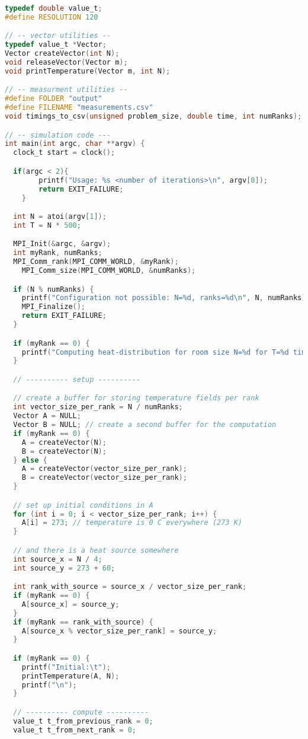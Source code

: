 \documentclass[UTF-8]{article}
\begin{document}
\begin{itemize}
\begin{enumerate}[label=\textbf{\arabic *)}]
\begin{lstlisting}[language=c]
typedef double value_t;
#define RESOLUTION 120

// -- vector utilities --
typedef value_t *Vector;
Vector createVector(int N);
void releaseVector(Vector m);
void printTemperature(Vector m, int N);

// -- measurment utilities --
#define FOLDER "output"
#define FILENAME "measurements.csv"
void timings_to_csv(unsigned problem_size, double time, int numRanks);

// -- simulation code ---
int main(int argc, char **argv) {
  clock_t start = clock();

  if(argc < 2){
		printf("Usage: %s <number of iterations>\n", argv[0]);
		return EXIT_FAILURE;
	}

  int N = atoi(argv[1]);
  int T = N * 500;

  MPI_Init(&argc, &argv);
  int myRank, numRanks;
  MPI_Comm_rank(MPI_COMM_WORLD, &myRank);
	MPI_Comm_size(MPI_COMM_WORLD, &numRanks);

  if (N % numRanks) {
    printf("Configuration not possible: N=%d, ranks=%d\n", N, numRanks);
    MPI_Finalize();
    return EXIT_FAILURE;
  }

  if (myRank == 0) {
    printf("Computing heat-distribution for room size N=%d for T=%d timesteps\n", N, T);
  }

  // ---------- setup ----------

  // create a buffer for storing temperature fields per rank
  int vector_size_per_rank = N / numRanks;
  Vector A = NULL;
  Vector B = NULL; // create a second buffer for the computation
  if (myRank == 0) {
    A = createVector(N);
    B = createVector(N);
  } else {
    A = createVector(vector_size_per_rank);
    B = createVector(vector_size_per_rank);
  }

  // set up initial conditions in A
  for (int i = 0; i < vector_size_per_rank; i++) {
    A[i] = 273; // temperature is 0 C everywhere (273 K)
  }

  // and there is a heat source somewhere
  int source_x = N / 4;
  int source_y = 273 + 60;

  int rank_with_source = source_x / vector_size_per_rank;
  if (myRank == 0) {
    A[source_x] = source_y;
  }
  if (myRank == rank_with_source) {
    A[source_x % vector_size_per_rank] = source_y;
  }

  if (myRank == 0) {
    printf("Initial:\t");
    printTemperature(A, N);
    printf("\n");
  }

  // ---------- compute ----------
  value_t t_from_previous_rank = 0;
  value_t t_from_next_rank = 0;


\end{lstlisting}
\end{enumerate}
\end{itemize}
\end{document}
